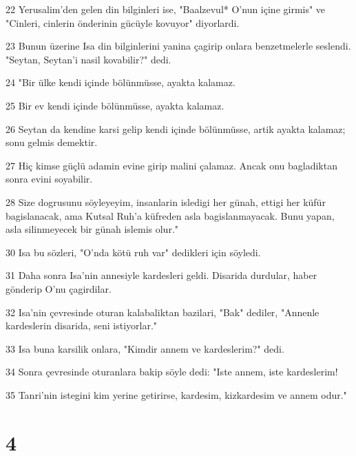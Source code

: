 \par 22 Yerusalim'den gelen din bilginleri ise, "Baalzevul* O'nun içine girmis" ve "Cinleri, cinlerin önderinin gücüyle kovuyor" diyorlardi.
\par 23 Bunun üzerine Isa din bilginlerini yanina çagirip onlara benzetmelerle seslendi. "Seytan, Seytan'i nasil kovabilir?" dedi.
\par 24 "Bir ülke kendi içinde bölünmüsse, ayakta kalamaz.
\par 25 Bir ev kendi içinde bölünmüsse, ayakta kalamaz.
\par 26 Seytan da kendine karsi gelip kendi içinde bölünmüsse, artik ayakta kalamaz; sonu gelmis demektir.
\par 27 Hiç kimse güçlü adamin evine girip malini çalamaz. Ancak onu bagladiktan sonra evini soyabilir.
\par 28 Size dogrusunu söyleyeyim, insanlarin isledigi her günah, ettigi her küfür bagislanacak, ama Kutsal Ruh'a küfreden asla bagislanmayacak. Bunu yapan, asla silinmeyecek bir günah islemis olur."
\par 30 Isa bu sözleri, "O'nda kötü ruh var" dedikleri için söyledi.
\par 31 Daha sonra Isa'nin annesiyle kardesleri geldi. Disarida durdular, haber gönderip O'nu çagirdilar.
\par 32 Isa'nin çevresinde oturan kalabaliktan bazilari, "Bak" dediler, "Annenle kardeslerin disarida, seni istiyorlar."
\par 33 Isa buna karsilik onlara, "Kimdir annem ve kardeslerim?" dedi.
\par 34 Sonra çevresinde oturanlara bakip söyle dedi: "Iste annem, iste kardeslerim!
\par 35 Tanri'nin istegini kim yerine getirirse, kardesim, kizkardesim ve annem odur."

\chapter{4}

